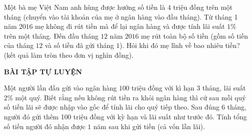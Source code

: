 \begin{vd}%
	Một bà mẹ Việt Nam anh hùng được hưởng số tiền là $4$ triệu đồng trên một tháng (chuyển vào tài khoản của mẹ ở ngân hàng vào đầu tháng). Từ tháng 1 năm $2016$ mẹ không đi rút tiền mà để lại ngân hàng và được tính lãi suất $1\%$ trên một tháng. Đến đầu tháng $12$ năm $2016$ mẹ rút toàn bộ số tiền (gồm số tiền của tháng $12$ và số tiền đã gửi tháng $1$). Hỏi khi đó mẹ lĩnh về bao nhiêu tiền? (kết quả làm tròn theo đơn vị nghìn đồng).
	\end{vd}
\begin{center}
	\textbf{BÀI TẬP TỰ LUYỆN }
\end{center}
\begin{bt}%
	Một người lần đầu gửi vào ngân hàng $100$ triệu đồng với kì hạn $3$ tháng, lãi suất 2\% một quý. Biết rằng nếu không rút tiền ra khỏi ngân hàng thì cứ sau mỗi quý số tiền lãi sẽ được nhập vào gốc để tính lãi cho quý tiếp theo. Sau đúng $6$ tháng, người đó gửi thêm 100 triệu đồng với kỳ hạn và lãi suất như trước đó. Tính tổng số tiền người đó nhận được $1$ năm sau khi gửi tiền (cả vốn lẫn lãi).
					
\end{bt}
